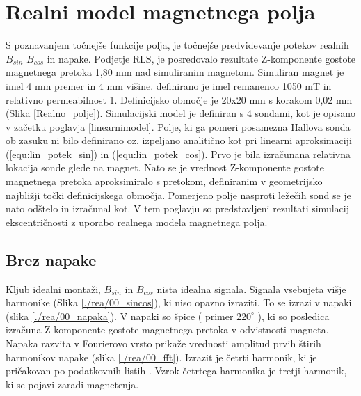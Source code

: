 \chapter{Realni model magnetnega polja}
S poznavanjem točnejše funkcije polja, je točnejše predvidevanje potekov realnih $B_{sin}$ $B_{cos}$ in napake. Podjetje RLS,  je posredovalo rezultate Z-komponente gostote magnetnega pretoka 1,80 mm nad simuliranim magnetom. Simuliran magnet je imel 4 mm premer in 4 mm višine. definirano je imel remanenco 1050 mT in relativno permeabilnost 1.  Definicijsko območje  je 20x20 mm s korakom 0,02 mm (Slika \ref{Realno_polje}).
Simulacijski model je definiran s 4 sondami, kot je opisano v začetku poglavja \ref{linearnimodel}.
Polje, ki ga pomeri posamezna Hallova sonda ob zasuku ni bilo definirano oz. izpeljano analitično kot pri linearni aproksimaciji (\ref{equ:lin_potek_sin}) in (\ref{equ:lin_potek_cos}).  Prvo je bila izračunana relativna lokacija sonde glede na magnet. Nato se je vrednost Z-komponente gostote magnetnega pretoka  aproksimiralo s pretokom, definiranim v geometrijsko najbližji točki definicijskega območja.
Pomerjeno polje nasproti ležečih sond se je nato odštelo in izračunal kot.
V tem poglavju so predstavljeni rezultati simulacij ekscentričnosti z uporabo realnega modela magnetnega polja.
\section{Brez napake}
Kljub idealni montaži, $B_{sin}$ in $B_{cos}$ nista idealna signala.  Signala vsebujeta višje harmonike (Slika \ref{./rea/00_sincos}), ki niso opazno izraziti. To se izrazi v napaki (slika \ref{./rea/00_napaka}). V napaki so špice ( primer $220^{\circ}$ ), ki so posledica izračuna Z-komponente gostote  magnetnega pretoka v odvistnosti magneta. Napaka razvita v Fourierovo vrsto prikaže vrednosti amplitud prvih štirih harmonikov napake (slika \ref{./rea/00_fft}). Izrazit je četrti harmonik, ki je pričakovan po podatkovnih listih \cite{AM8192}. Vzrok četrtega harmonika je tretji harmonik, ki se pojavi zaradi magnetenja.
\newpage
